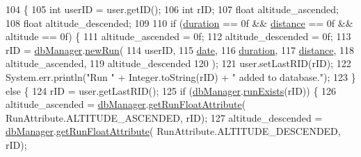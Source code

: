 \begin{DoxyCode}
104                                                                                                \{
105         \textcolor{keywordtype}{int} userID = user.getID();
106         \textcolor{keywordtype}{int} rID;
107         \textcolor{keywordtype}{float} altitude\_ascended;
108         \textcolor{keywordtype}{float} altitude\_descended;
109 
110         \textcolor{keywordflow}{if} (\mbox{\hyperlink{classcom_1_1activitytracker_1_1_run_a5e38d293d29d4b65c9290ff4bee82e03}{duration}} == 0f && \mbox{\hyperlink{classcom_1_1activitytracker_1_1_run_a7b4ca8c4ecea4da1653f03b8c8fc16a8}{distance}} == 0f && altitude == 0f) \{
111             altitude\_ascended = 0f;
112             altitude\_descended = 0f;
113             rID = \mbox{\hyperlink{classcom_1_1activitytracker_1_1_run_ab90e32eda9f4c671ae3575f971edca6b}{dbManager}}.\mbox{\hyperlink{classcom_1_1activitytracker_1_1_d_b_manager_ae0504a939b6f165aa5c3cca9eb8df049}{newRun}}(
114                     userID,
115                     \mbox{\hyperlink{classcom_1_1activitytracker_1_1_run_a66934b1f4fe6bc74a4e98574a2892764}{date}},
116                     \mbox{\hyperlink{classcom_1_1activitytracker_1_1_run_a5e38d293d29d4b65c9290ff4bee82e03}{duration}},
117                     \mbox{\hyperlink{classcom_1_1activitytracker_1_1_run_a7b4ca8c4ecea4da1653f03b8c8fc16a8}{distance}},
118                     altitude\_ascended,
119                     altitude\_descended
120             );
121             user.setLastRID(rID);
122             System.err.println(\textcolor{stringliteral}{"Run "} + Integer.toString(rID) + \textcolor{stringliteral}{" added to database."});
123         \} \textcolor{keywordflow}{else} \{
124             rID = user.getLastRID();
125             \textcolor{keywordflow}{if} (\mbox{\hyperlink{classcom_1_1activitytracker_1_1_run_ab90e32eda9f4c671ae3575f971edca6b}{dbManager}}.\mbox{\hyperlink{classcom_1_1activitytracker_1_1_d_b_manager_a723ac1c573bacdd0b62894357bd65a9b}{runExists}}(rID)) \{
126                 altitude\_ascended = \mbox{\hyperlink{classcom_1_1activitytracker_1_1_run_ab90e32eda9f4c671ae3575f971edca6b}{dbManager}}.\mbox{\hyperlink{classcom_1_1activitytracker_1_1_d_b_manager_a666452f1e5862f90c06b0beb9a9fcfdd}{getRunFloatAttribute}}(
      RunAttribute.ALTITUDE\_ASCENDED, rID);
127                 altitude\_descended = \mbox{\hyperlink{classcom_1_1activitytracker_1_1_run_ab90e32eda9f4c671ae3575f971edca6b}{dbManager}}.\mbox{\hyperlink{classcom_1_1activitytracker_1_1_d_b_manager_a666452f1e5862f90c06b0beb9a9fcfdd}{getRunFloatAttribute}}(
      RunAttribute.ALTITUDE\_DESCENDED, rID);

\end{DoxyCode}
